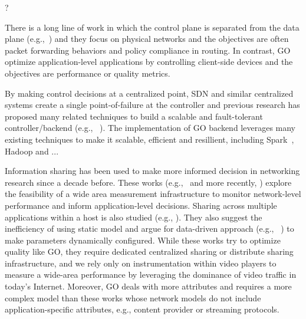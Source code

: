 ?


 There is a long line of work in which the control plane is separated from the data plane (e.g.,~\cite{rcp,onix,4d,openflow}) and they focus on physical networks and the objectives are often packet forwarding behaviors and policy compliance in routing. In contrast, GO optimize application-level applications by controlling client-side devices and the objectives are performance or quality metrics.  

 By making control decisions at a centralized point, SDN and similar centralized systems create a single point-of-failure at the controller and previous research has proposed many related techniques to build a scalable and fault-tolerant controller/backend (e.g., ~\cite{tootoonchian2012controller,yan2007tesseract}). The implementation of GO backend leverages many existing techniques to make it scalable, efficient and resillient, including Spark~\cite{spark}, Hadoop and ...

 Information sharing has been used to make more informed decision in networking research since a decade before. These works (e.g.,~\cite{stemm2000network} and more recently, \cite{choffnes2010crowdsourcing}) explore the feasibility of a wide area measurement infrastructure to monitor network-level performance and inform application-level decisions. Sharing across multiple applications within a host is also studied (e.g., \cite{balakrishnan1999integrated}). They also suggest the inefficiency of using static model and argue for data-driven approach (e.g., ~\cite{Winstein:2013:TEM:2486001.2486020, sivaraman2013no}) to make parameters dynamically configured.
While these works try to optimize quality like GO, they require dedicated centralized sharing or distribute sharing infrastructure, and we rely only on instrumentation within video players to measure a wide-area performance by leveraging the dominance of video traffic in today's Internet. Moreover, GO deals with more attributes and requires a more complex model than these works whose network models do not include application-specific attributes, e.g., content provider or streaming protocols. 